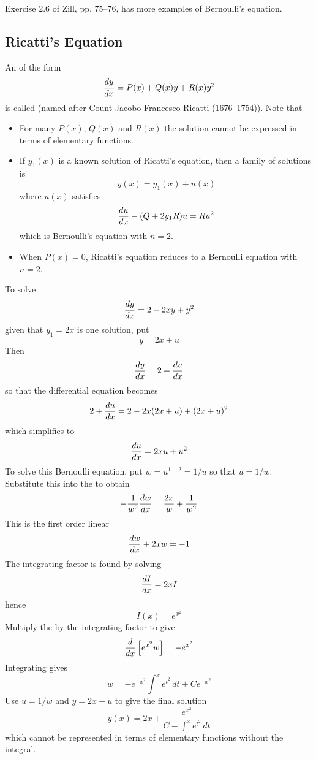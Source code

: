 \begin{exercise}
Exercise 2.6 of Zill, pp. 75--76, has more examples of Bernoulli's equation.
\end{exercise}

\subsection{Ricatti's Equation}
\label{ode sec:ricatti}

An \ODE of the form
$$\frac{dy}{dx}=P(x)+Q(x)y+R(x)y^2$$
is called  (named after Count Jacobo Francesco
Ricatti (1676--1754)).  Note that
\begin{itemize}
\item For many $P(x)$, $Q(x)$ and $R(x)$ the solution cannot be expressed in
terms of elementary functions.
\item If $y_1(x)$ is a known solution of Ricatti's equation, then a family
of solutions is
$$y(x)=y_1(x)+u(x)$$
where $u(x)$ satisfies
$$\frac{du}{dx}-(Q+2y_1R)u=Ru^2$$
which is Bernoulli's equation with $n=2$.
\item When $P(x)=0$, Ricatti's equation reduces to a Bernoulli equation with
$n=2$.
\end{itemize}

\begin{example}
To solve
$$\frac{dy}{dx}=2-2xy+y^2$$
given that $y_1=2x$ is one solution, put
$$y=2x+u$$
Then
$$\frac{dy}{dx}=2+\frac{du}{dx}$$
so that the differential equation becomes
$$2+\frac{du}{dx}=2-2x(2x+u)+(2x+u)^2$$
which simplifies to
$$\frac{du}{dx}=2xu+u^2$$
To solve this Bernoulli equation, put $w=u^{1-2}=1/u$ so that
$u=1/w$.  Substitute this into the \ODE to obtain
$$-\frac{1}{w^2}\frac{dw}{dx}=\frac{2x}{w}+\frac{1}{w^2}$$
This is the first order linear \ODE
$$\frac{dw}{dx}+2xw=-1$$
The integrating factor is found by solving
$$\frac{dI}{dx}=2xI$$
hence
$$I(x)=e^{x^2}$$
Multiply the \ODE by the integrating factor to give
$$\frac{d}{d{x}}\left[e^{x^2}w\right]=-e^{x^2}$$
Integrating gives
$$w=-e^{-x^2}\int^xe^{t^2}\,dt+Ce^{-x^2}$$
Use $u=1/w$ and $y=2x+u$ to give the final solution
$$y(x)=2x+\frac{e^{x^2}}{C-\int^xe^{t^2}\,dt}$$
which cannot be represented in terms of elementary functions without the 
integral.
\end{example}

